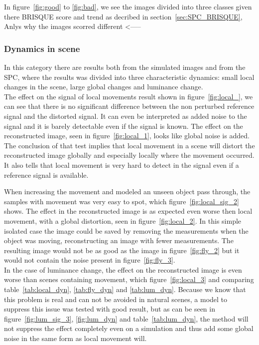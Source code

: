 In figure~\ref{fig:good} to \ref{fig:bad}, we see the images divided into three classes given there BRISQUE score and trend as decribed in section~\ref{sec:SPC_BRISQUE}, Anlys why the images scorred different <-----


\subsubsection{Dynamics in scene}
In this category there are results both from the simulated images and from the SPC, where the results was divided into three characteristic dynamics: small local changes in the scene, large global changes and luminance change.\\[0.1in]

The effect on the signal of local movements result shown in figure~\ref{fig:local_}, we can see that there is no significant difference between the non perturbed reference signal and the distorted signal. It can even be interpreted as added noise to the signal and it is barely detectable even if the signal is known. The effect on the reconstructed image, seen in figure~\ref{fig:local_1}, looks like global noise is added. The conclusion of that test implies that local movement in a scene will distort the reconstructed image globally and especially locally where the movement occurred. It also tells that local movement is very hard to detect in the signal even if a reference signal is available.\\[0.1in] 

When increasing the movement and modeled an unseen object pass through, the samples with movement was very easy to spot, which figure~\ref{fig:local_sig_2} shows. The effect in the reconstructed image is as expected even worse then local movement, with a global distortion, seen in figure~\ref{fig:local_2}. In this simple isolated case the image could be saved by removing the measurements when the object was moving, reconstructing an image with fewer measurements. The resulting image would not be as good as the image in figure~\ref{fig:fly_2} but it would not contain the noise present in figure~\ref{fig:fly_3}. \\[0.1in]


In the case of luminance change, the effect on the reconstructed image is even worse than scenes containing movement, which figure~\ref{fig:local_3} and comparing table~\ref{tab:local_dyn}, \ref{tab:fly_dyn} and \ref{tab:lum_dyn}. Because we know that this problem is real and can not be avoided in natural scenes, a model to suppress this issue was tested with good result, but as can be seen in figure~\ref{fig:lum_sig_3}, \ref{fig:lum_dyn} and table~\ref{tab:lum_dyn}, the method will not suppress the effect completely even on a simulation and thus add some global noise in the same form as local movement will.\\[0.1in]

